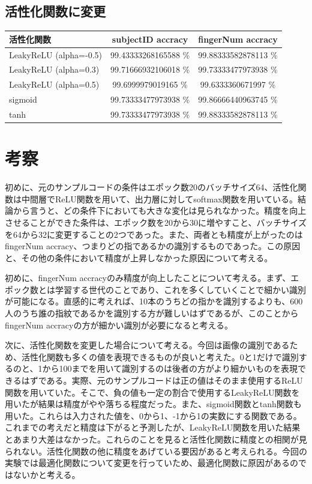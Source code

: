 \documentclass[a4paper, 11pt, titlepage]{jsarticle}
\begin{document}
\subsection{活性化関数に変更}
\begin{table}[htb]
  \begin{tabular}{|l|c|c|}
    \hline
    活性化関数 & subjectID accracy & fingerNum accracy \\ \hline
    LeakyReLU (alpha=-0.5) & 99.43333268165588 \% & 99.88333582878113 \% \\ \hline
    LeakyReLU (alpha=0.3) & 99.71666932106018 \% & 99.73333477973938 \% \\ \hline
    LeakyReLU (alpha=0.5) & 99.6999979019165 \% & 99.6333360671997 \% \\ \hline
    sigmoid & 99.73333477973938 \% & 99.86666440963745 \% \\ \hline
    tanh & 99.73333477973938 \% & 99.88333582878113 \% \\ \hline
  \end{tabular}
\end{table}

\clearpage


\section{考察}
初めに、元のサンプルコードの条件はエポック数20のバッチサイズ64、活性化関数は中間層でReLU関数を用いて、出力層に対してsoftmax関数を用いている。結論から言うと、どの条件下においても大きな変化は見られなかった。精度を向上させることができた条件は、エポック数を20から30に増やすこと、バッチサイズを64から32に変更することの2つであった。また、両者とも精度が上がったのは fingerNum accracy、つまりどの指であるかの識別するものであった。この原因と、その他の条件において精度が上昇しなかった原因について考える。

初めに、fingerNum accracyのみ精度が向上したことについて考える。まず、エポック数とは学習する世代のことであり、これを多くしていくことで細かい識別が可能になる。直感的に考えれば、10本のうちどの指かを識別するよりも、600人のうち誰の指紋であるかを識別する方が難しいはずであるが、このことからfingerNum accracyの方が細かい識別が必要になると考える。

次に、活性化関数を変更した場合について考える。今回は画像の識別であるため、活性化関数も多くの値を表現できるものが良いと考えた。0と1だけで識別するのと、1から100までを用いて識別するのは後者の方がより細かいものを表現できるはずである。実際、元のサンプルコードは正の値はそのまま使用するReLU関数を用いていた。そこで、負の値も一定の割合で使用するLeakyReLU関数を用いたが結果は精度がやや落ちる程度だった。また、sigmoid関数とtanh関数も用いた。これらは入力された値を、0から1、-1から1の実数にする関数である。これまでの考えだと精度は下がると予測したが、LeakyReLU関数を用いた結果とあまり大差はなかった。これらのことを見ると活性化関数に精度との相関が見られない。活性化関数の他に精度をあげている要因があると考えられる。今回の実験では最適化関数について変更を行っていため、最適化関数に原因があるのではないかと考える。
\end{document}

